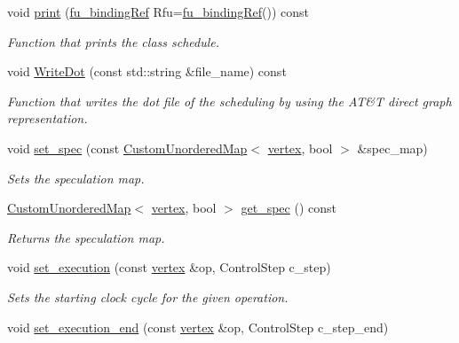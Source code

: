 \begin{DoxyCompactItemize}
void \hyperlink{classSchedule_ad25e768e9aeea647c95939f49b46ce7a}{print} (\hyperlink{fu__binding_8hpp_a619181df8ab98d7b7e17de58ac44b065}{fu\+\_\+binding\+Ref} Rfu=\hyperlink{fu__binding_8hpp_a619181df8ab98d7b7e17de58ac44b065}{fu\+\_\+binding\+Ref}()) const
\begin{DoxyCompactList}\small\item\em Function that prints the class schedule. \end{DoxyCompactList}\item 
void \hyperlink{classSchedule_af0fedbcf697272b4f295bf0e7ef3a358}{Write\+Dot} (const std\+::string \&file\+\_\+name) const
\begin{DoxyCompactList}\small\item\em Function that writes the dot file of the scheduling by using the AT\&T direct graph representation. \end{DoxyCompactList}\item 
void \hyperlink{classSchedule_ab6c18b64a2d8e511b1aac306c439978a}{set\+\_\+spec} (const \hyperlink{custom__map_8hpp_ad1ed68f2ff093683ab1a33522b144adc}{Custom\+Unordered\+Map}$<$ \hyperlink{graph_8hpp_abefdcf0544e601805af44eca032cca14}{vertex}, bool $>$ \&spec\+\_\+map)
\begin{DoxyCompactList}\small\item\em Sets the speculation map. \end{DoxyCompactList}\item 
\hyperlink{custom__map_8hpp_ad1ed68f2ff093683ab1a33522b144adc}{Custom\+Unordered\+Map}$<$ \hyperlink{graph_8hpp_abefdcf0544e601805af44eca032cca14}{vertex}, bool $>$ \hyperlink{classSchedule_a289a13765e99b83118877fdec668fff1}{get\+\_\+spec} () const
\begin{DoxyCompactList}\small\item\em Returns the speculation map. \end{DoxyCompactList}\item 
void \hyperlink{classSchedule_a1bf4292733805b6e305ec28395cd04d0}{set\+\_\+execution} (const \hyperlink{graph_8hpp_abefdcf0544e601805af44eca032cca14}{vertex} \&op, Control\+Step c\+\_\+step)
\begin{DoxyCompactList}\small\item\em Sets the starting clock cycle for the given operation. \end{DoxyCompactList}\item 
void \hyperlink{classSchedule_a1c75a65910f1d1b9cf3e9f27e91a756e}{set\+\_\+execution\+\_\+end} (const \hyperlink{graph_8hpp_abefdcf0544e601805af44eca032cca14}{vertex} \&op, Control\+Step c\+\_\+step\+\_\+end)

\end{DoxyCompactItemize}
